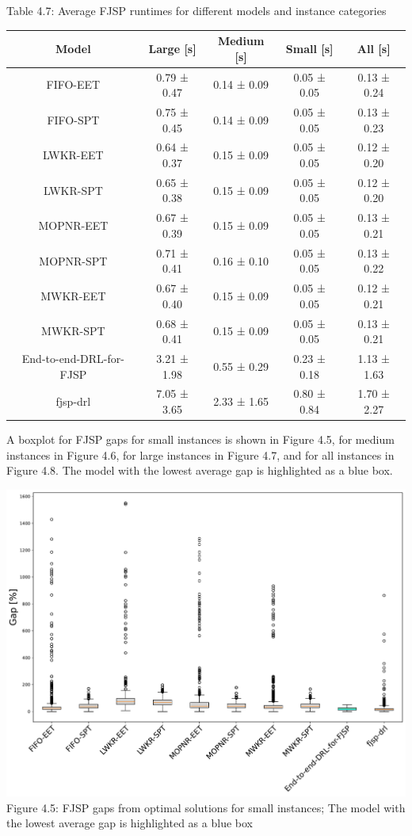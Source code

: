 \begin{table}
    Table 4.7: Average FJSP runtimes for different models and instance categories\\
    \vspace{1mm}
    \label{table:4.5}
    \footnotesize 
    \begin{tabular}{ccccc}
        \toprule
        Model & Large [s] & Medium [s] & Small [s] & All [s] \\
        \midrule
        FIFO-EET & 0.79 ± 0.47 & 0.14 ± 0.09 & 0.05 ± 0.05 & 0.13 ± 0.24 \\
        FIFO-SPT & 0.75 ± 0.45 & 0.14 ± 0.09 & 0.05 ± 0.05 & 0.13 ± 0.23 \\
        LWKR-EET & 0.64 ± 0.37 & 0.15 ± 0.09 & 0.05 ± 0.05 & 0.12 ± 0.20 \\
        LWKR-SPT & 0.65 ± 0.38 & 0.15 ± 0.09 & 0.05 ± 0.05 & 0.12 ± 0.20 \\
        MOPNR-EET & 0.67 ± 0.39 & 0.15 ± 0.09 & 0.05 ± 0.05 & 0.13 ± 0.21 \\
        MOPNR-SPT & 0.71 ± 0.41 & 0.16 ± 0.10 & 0.05 ± 0.05 & 0.13 ± 0.22 \\
        MWKR-EET & 0.67 ± 0.40 & 0.15 ± 0.09 & 0.05 ± 0.05 & 0.12 ± 0.21 \\
        MWKR-SPT & 0.68 ± 0.41 & 0.15 ± 0.09 & 0.05 ± 0.05 & 0.13 ± 0.21 \\
        End-to-end-DRL-for-FJSP & 3.21 ± 1.98 & 0.55 ± 0.29 & 0.23 ± 0.18 & 1.13 ± 1.63 \\
        fjsp-drl & 7.05 ± 3.65 & 2.33 ± 1.65 & 0.80 ± 0.84 & 1.70 ± 2.27 \\
        \bottomrule
    \end{tabular}
\end{table}


A boxplot for FJSP gaps for small instances is shown in Figure 4.5, for medium instances in Figure 4.6, for large instances in Figure 4.7, and for all instances in Figure 4.8. The model with the lowest average gap is highlighted as a blue box.

\begin{center}
    \includegraphics[width=0.8\linewidth]{images/horizontal_boxplot_fjsp_small.pdf}\\
    Figure 4.5: FJSP gaps from optimal solutions for small instances; The model with the lowest average gap is highlighted as a blue box
\end{center}


